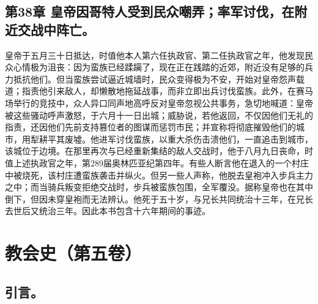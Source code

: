 \subsection{第38章 皇帝因哥特人受到民众嘲弄；率军讨伐，在附近交战中阵亡。}

皇帝于五月三十日抵达，时值他本人第六任执政官、第二任执政官之年，他发现民众心情极为沮丧：因为蛮族已经蹂躏了，现在正在践踏的近郊，附近没有足够的兵力抵抗他们。但当蛮族尝试逼近城墙时，民众变得极为不安，开始对皇帝怨声载道；指责他引来敌人，却懒散地拖延战事，而非立即出兵讨伐蛮族。此外，在赛马场举行的竞技中，众人异口同声地高呼反对皇帝忽视公共事务，急切地喊道：皇帝被这些骚动呼声激怒，于六月十一日出城；威胁说，若他返回，不仅因他们无礼的指责，还因他们先前支持篡位者的图谋而惩罚市民；并宣称将彻底摧毁他们的城市，用犁耕平其废墟。他进军讨伐蛮族，以重大杀伤击溃他们，一直追击到城市，该城位于边境。在那里再次与已经重新集结的敌人交战时，他于八月九日丧命，时值上述执政官之年，第289届奥林匹亚纪第四年。有些人断言他在退入的一个村庄中被烧死，该村庄遭蛮族袭击并纵火。但另一些人声称，他脱去皇袍冲入步兵主力之中；而当骑兵叛变拒绝交战时，步兵被蛮族包围，全军覆没。据称皇帝也在其中倒下，但因未穿皇袍而无法辨认。他死于五十岁，与兄长共同统治十三年，在兄长去世后又统治三年。因此本书包含十六年期间的事迹。\par



\section{教会史（第五卷）}


\subsection{引言。}

